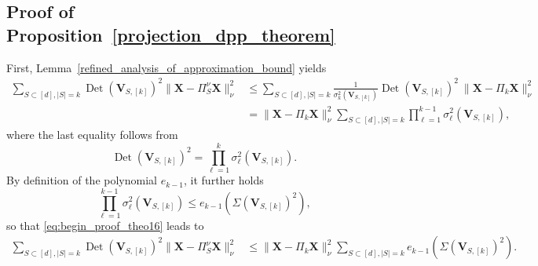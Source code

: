 \documentclass[twoside,11pt]{book}
\numberwithin{theorem}{chapter}
\numberwithin{definition}{chapter}
\numberwithin{proposition}{chapter}
\numberwithin{corollary}{chapter}
\numberwithin{example}{chapter}
\numberwithin{lemma}{chapter}
\numberwithin{assumption}{chapter}
\numberwithin{equation}{chapter}
\numberwithin{figure}{chapter}
\DeclareMathOperator{\Det}{Det}
\DeclareMathOperator{\Vol}{Vol}
\begin{document}
\subsection{Proof of Proposition~\ref{projection_dpp_theorem}}
First, Lemma~\ref{refined_analysis_of_approximation_bound} yields
	\begin{align}
	\sum\limits_{S \subset [d], |S| = k} \Det(\bm{V}_{S,[k]})^{2}\| \bm{X} - \Pi_{S}^{\nu}\bm{X} \|_{\nu}^{2} & \leq  \sum\limits_{S 	\subset [d], |S| = k} \frac{1}{\sigma_{k}^{2}(\bm{V}_{S,[k]})}\Det(\bm{V}_{S,[k]})^{2} \: \|\bm{X} - \Pi_{k}\bm{X}\|_{\nu}^{2}  \nonumber\\
 	& =  \|\bm{X} - \Pi_{k}\bm{X}\|_{\nu}^{2} \sum\limits_{S \subset [d], |S| = k} \prod_{\ell =1}^{k-1}\sigma_{\ell}^{2}(\bm{V}_{S,[k]}),
 \label{eq:begin_proof_theo16}
\end{align}
where the last equality follows from
\begin{equation}
	\Det(\bm{V}_{S,[k]})^{2} = \prod_{\ell =1}^{k}\sigma_{\ell}^{2}(\bm{V}_{S,[k]}).
\end{equation}
By definition of the polynomial $e_{k-1}$, it further holds
\begin{equation}
	\prod_{\ell =1}^{k-1}\sigma_{\ell}^{2}(\bm{V}_{S,[k]}) \leq e_{k-1}(\Sigma(\bm{V}_{S,[k]})^{2}),
\end{equation}
so that \eqref{eq:begin_proof_theo16} leads to
\begin{align}
\sum\limits_{S \subset [d], |S| = k} \Det(\bm{V}_{S,[k]})^{2}\| \bm{X} - \Pi_{S}^{\nu}\bm{X} \|_{\nu}^{2} & \leq  \|\bm{X} - \Pi_{k}\bm{X}\|_{\nu}^{2} \sum\limits_{S \subset [d], |S| = k} e_{k-1}(\Sigma(\bm{V}_{S,[k]})^{2}).
\label{eq:middle_proof_theo16}
\end{align}
\end{document}

